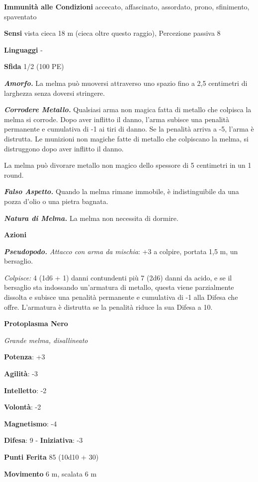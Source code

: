 \begin{multicols}{2}
\textbf{Immunità alle Condizioni} accecato, affascinato, assordato,
prono, sfinimento, spaventato

\textbf{Sensi} vista cieca 18 m (cieca oltre questo raggio), Percezione
passiva 8

\textbf{Linguaggi} -

\textbf{Sfida} 1/2 (100 PE)

\emph{\textbf{Amorfo.}} La melma può muoversi attraverso uno spazio fino
a 2,5 centimetri di larghezza senza doversi stringere.

\emph{\textbf{Corrodere Metallo.}} Qualsiasi arma non magica fatta di
metallo che colpisca la melma si corrode. Dopo aver inflitto il danno,
l'arma subisce una penalità permanente e cumulativa di -1 ai tiri di
danno. Se la penalità arriva a -5, l'arma è distrutta. Le munizioni non
magiche fatte di metallo che colpiscano la melma, si distruggono dopo
aver inflitto il danno.

La melma può divorare metallo non magico dello spessore di 5 centimetri
in un 1 round.

\emph{\textbf{Falso Aspetto.}} Quando la melma rimane immobile, è
indistinguibile da una pozza d'olio o una pietra bagnata.

\emph{\textbf{Natura di Melma.}} La melma non necessita di dormire.

\textbf{Azioni}

\emph{\textbf{Pseudopodo.} Attacco con arma da mischia}: +3 a colpire,
portata 1,5 m, un bersaglio.

\emph{Colpisce:} 4 (1d6 + 1) danni contundenti più 7 (2d6) danni da
acido, e se il bersaglio sta indossando un'armatura di metallo, questa
viene parzialmente dissolta e subisce una penalità permanente e
cumulativa di -1 alla Difesa che offre. L'armatura è distrutta se la
penalità riduce la sua Difesa a 10.



\textbf{Protoplasma Nero}

\emph{Grande melma, disallineato}

\textbf{Potenza}: +3

\textbf{Agilità}: -3

\textbf{Intelletto}: -2

\textbf{Volontà}: -2

\textbf{Magnetismo}: -4

\textbf{Difesa}: 9 - \textbf{Iniziativa}: -3

\textbf{Punti Ferita} 85 (10d10 + 30)

\textbf{Movimento} 6 m, scalata 6 m


\end{multicols}

